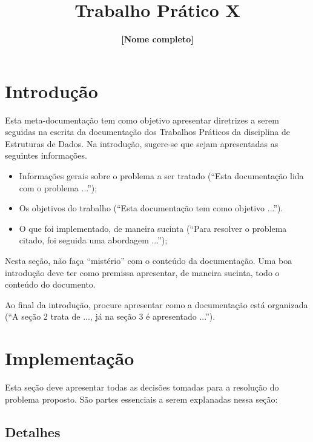 \documentclass[11pt]{article}
\title{\textbf{Trabalho Prático X}}
\author{\textbf{[Nome completo]}}
\date{\parbox{\linewidth}{\centering%
    Universidade Federal de Minas Gerais (UFMG)\endgraf
    Belo Horizonte - MG - Brasil\endgraf\bigskip
    \href{mailto:email@ufmg.br}{email@ufmg.br}}}
\begin{document}
\maketitle


\section{Introdução}

    \par Esta meta-documentação tem como objetivo apresentar diretrizes a serem seguidas na escrita da documentação dos Trabalhos Práticos da disciplina de Estruturas de Dados. Na introdução, sugere-se que sejam apresentadas as seguintes informações.
    \begin{itemize}
        \item Informações gerais sobre o problema a ser tratado (“Esta documentação lida com o problema ...”);
        \item Os objetivos do trabalho (“Esta documentação tem como objetivo ...”).
        \item O que foi implementado, de maneira sucinta (“Para resolver o problema citado, foi seguida uma abordagem ...”);
    \end{itemize}
    
    \par Nesta seção, não faça “mistério” com o conteúdo da documentação. Uma boa introdução deve ter como premissa apresentar, de maneira sucinta, todo o conteúdo do documento.
    \par Ao final da introdução, procure apresentar como a documentação está organizada (“A seção 2 trata de ..., já na seção 3 é apresentado ...”).


\section{Implementação}

    \par Esta seção deve apresentar todas as decisões tomadas para a resolução do problema proposto. São partes essenciais a serem explanadas nessa seção:

    \subsection{Detalhes}
\end{document}
